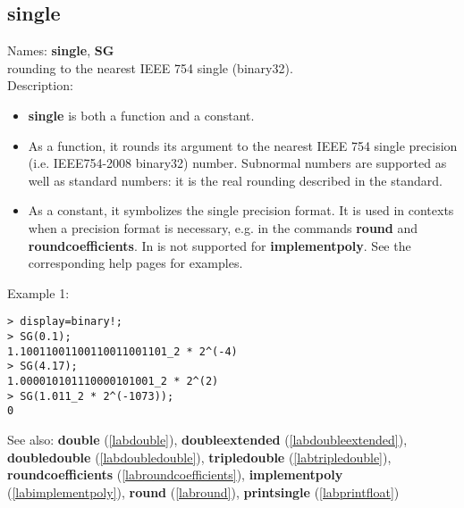 \subsection{single}
\label{labsingle}
\noindent Names: \textbf{single}, \textbf{SG}\\
rounding to the nearest IEEE 754 single (binary32).\\
\noindent Description: \begin{itemize}

\item \textbf{single} is both a function and a constant.

\item As a function, it rounds its argument to the nearest IEEE 754 single precision (i.e. IEEE754-2008 binary32) number.
   Subnormal numbers are supported as well as standard numbers: it is the real
   rounding described in the standard.

\item As a constant, it symbolizes the single precision format. It is used in 
   contexts when a precision format is necessary, e.g. in the commands 
   \textbf{round} and \textbf{roundcoefficients}. In is not supported for \textbf{implementpoly}.
   See the corresponding help pages for examples.
\end{itemize}
\noindent Example 1: 
\begin{center}\begin{minipage}{15cm}\begin{Verbatim}[frame=single]
> display=binary!;
> SG(0.1);
1.10011001100110011001101_2 * 2^(-4)
> SG(4.17);
1.000010101110000101001_2 * 2^(2)
> SG(1.011_2 * 2^(-1073));
0
\end{Verbatim}
\end{minipage}\end{center}
See also: \textbf{double} (\ref{labdouble}), \textbf{doubleextended} (\ref{labdoubleextended}), \textbf{doubledouble} (\ref{labdoubledouble}), \textbf{tripledouble} (\ref{labtripledouble}), \textbf{roundcoefficients} (\ref{labroundcoefficients}), \textbf{implementpoly} (\ref{labimplementpoly}), \textbf{round} (\ref{labround}), \textbf{printsingle} (\ref{labprintfloat})
